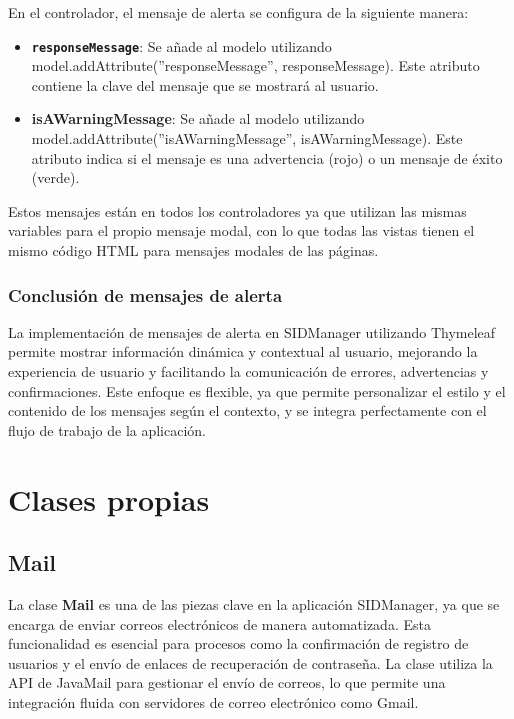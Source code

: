 \documentclass[draft]{scrbook}
\begin{document}
En el controlador, el mensaje de alerta se configura de la siguiente manera:

\begin{itemize}
    \item \textbf{\texttt{responseMessage}}: Se añade al modelo utilizando {model.addAttribute(''responseMessage'', responseMessage)}. Este atributo contiene la clave del mensaje que se mostrará al usuario.
    \item \textbf{{isAWarningMessage}}: Se añade al modelo utilizando {model.addAttribute(''isAWarningMessage'', isAWarningMessage)}. Este atributo indica si el mensaje es una advertencia (rojo) o un mensaje de éxito (verde).
\end{itemize}

Estos mensajes están en todos los controladores ya que utilizan las mismas variables para el propio mensaje modal, con lo que todas las vistas tienen el mismo código HTML para mensajes modales de las páginas.

\subsubsection{Conclusión de mensajes de alerta}

La implementación de mensajes de alerta en SIDManager utilizando Thymeleaf permite mostrar información dinámica y contextual al usuario, mejorando la experiencia de usuario y facilitando la comunicación de errores, advertencias y confirmaciones. Este enfoque es flexible, ya que permite personalizar el estilo y el contenido de los mensajes según el contexto, y se integra perfectamente con el flujo de trabajo de la aplicación.


\section{Clases propias}
\subsection{Mail}
\label{subsec:mail}

La clase \textbf{Mail} es una de las piezas clave en la aplicación SIDManager, ya que se encarga de enviar correos electrónicos de manera automatizada. Esta funcionalidad es esencial para procesos como la confirmación de registro de usuarios y el envío de enlaces de recuperación de contraseña. La clase utiliza la API de JavaMail para gestionar el envío de correos, lo que permite una integración fluida con servidores de correo electrónico como Gmail.
\end{document}
